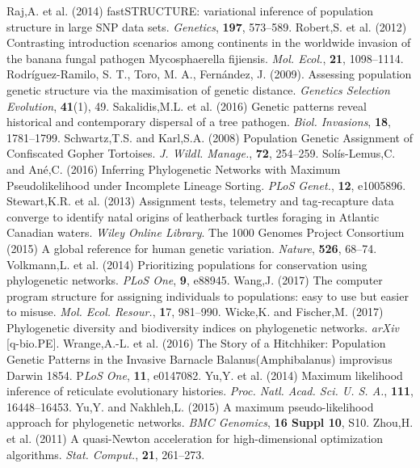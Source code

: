 \documentclass[final]{bioinfo}
\begin{document}
\begin{thebibliography}{}
\bibitem[a ()]{}Raj,A. et al. (2014) fastSTRUCTURE: variational inference of population structure in large SNP data sets. \textit{Genetics}, \textbf{197}, 573–589.
\bibitem[a ()]{}Robert,S. et al. (2012) Contrasting introduction scenarios among continents in the worldwide invasion of the banana fungal pathogen Mycosphaerella fijiensis. \textit{Mol. Ecol.}, \textbf{21}, 1098–1114.
\bibitem[a ()]{}Rodríguez-Ramilo, S. T., Toro, M. A., Fernández, J. (2009). Assessing population genetic structure via the maximisation of genetic distance. \textit{Genetics Selection Evolution}, \textbf{41}(1), 49.
\bibitem[a ()]{}Sakalidis,M.L. et al. (2016) Genetic patterns reveal historical and contemporary dispersal of a tree pathogen. \textit{Biol. Invasions}, \textbf{18}, 1781–1799.
\bibitem[a ()]{}Schwartz,T.S. and Karl,S.A. (2008) Population Genetic Assignment of Confiscated Gopher Tortoises. \textit{J. Wildl. Manage.}, \textbf{72}, 254–259.
\bibitem[a ()]{}Solís-Lemus,C. and Ané,C. (2016) Inferring Phylogenetic Networks with Maximum Pseudolikelihood under Incomplete Lineage Sorting. \textit{PLoS Genet.}, \textbf{12}, e1005896.
\bibitem[a ()]{}Stewart,K.R. et al. (2013) Assignment tests, telemetry and tag‐recapture data converge to identify natal origins of leatherback turtles foraging in Atlantic Canadian waters. \textit{Wiley Online Library}.
\bibitem[a ()]{}The 1000 Genomes Project Consortium (2015) A global reference for human genetic variation. \textit{Nature}, \textbf{526}, 68–74.
\bibitem[a ()]{}Volkmann,L. et al. (2014) Prioritizing populations for conservation using phylogenetic networks. \textit{PLoS One}, \textbf{9}, e88945.
\bibitem[a ()]{}Wang,J. (2017) The computer program structure for assigning individuals to populations: easy to use but easier to misuse. \textit{Mol. Ecol. Resour.}, \textbf{1}7, 981–990.
\bibitem[a ()]{}Wicke,K. and Fischer,M. (2017) Phylogenetic diversity and biodiversity indices on phylogenetic networks. \textit{arXiv }[q-bio.PE].
\bibitem[a ()]{}Wrange,A.-L. et al. (2016) The Story of a Hitchhiker: Population Genetic Patterns in the Invasive Barnacle Balanus(Amphibalanus) improvisus Darwin 1854. P\textit{LoS One}, \textbf{11}, e0147082.
\bibitem[a ()]{}Yu,Y. et al. (2014) Maximum likelihood inference of reticulate evolutionary histories. \textit{Proc. Natl. Acad. Sci. U. S. A.}, \textbf{111}, 16448–16453.
\bibitem[a ()]{}Yu,Y. and Nakhleh,L. (2015) A maximum pseudo-likelihood approach for phylogenetic networks. \textit{BMC Genomics}, \textbf{16 Suppl 10}, S10.
\bibitem[a ()]{}Zhou,H. et al. (2011) A quasi-Newton acceleration for high-dimensional optimization algorithms. \textit{Stat. Comput.}, \textbf{21}, 261–273.

\end{thebibliography}
\clearemptydoublepage
\end{document}
